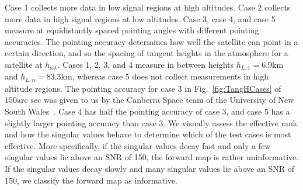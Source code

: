 Case 1 collects more data in low signal regions at high altitudes.
Case 2 collects more data in high signal regions at low altitudes.
Case 3, case 4, and case 5 measure at equidistantly spaced pointing angles with different pointing accuracies.
The pointing accuracy determines how well the satellite can point in a certain direction, and so the spacing of tangent heights in the atmosphere for a satellite at $h_{\text{sat}}$.
Cases 1, 2, 3, and 4 measure in between heights $h_{L,1} = 6.9$km and $h_{L,n} = 83.3$km, whereas case 5 does not collect measurements in high altitude regions.
The pointing accuracy for case 3 in Fig.~\ref{fig:TangHCases} of $150\text{arc sec}$ was given to us by the Canberra Space team of the University of New South Wales~\cite{CubeSatInternal}.
Case 4 has half the pointing accuracy of case 3, and case 5 has a slightly larger pointing accuracy than case 3.
We visually assess the effective rank and how the singular values behave to determine which of the test cases is most effective.
More specifically, if the singular values decay fast and only a few singular values lie above an SNR of 150, the forward map is rather uninformative.
If the singular values decay slowly and many singular values lie above an SNR of 150, we classify the forward map as informative.

